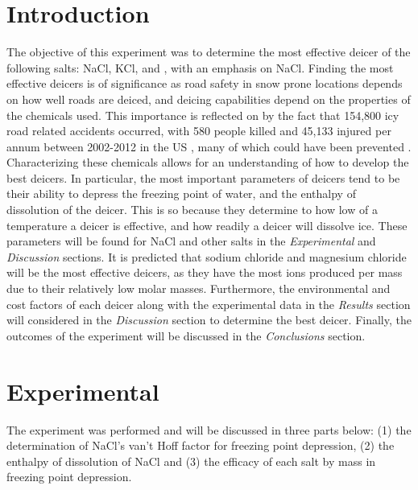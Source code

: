 \documentclass[12pt, letterpaper]{article}
\begin{document}
\section{Introduction}\doublespacing
The objective of this experiment was to determine the most effective deicer of the following salts:  NaCl, KCl,  and , with an emphasis on NaCl. Finding the most effective deicers is of significance as road safety in snow prone locations depends on how well roads are deiced, and deicing capabilities depend on the properties of the chemicals used. This importance is reflected on by the fact that 154,800 icy road related accidents occurred, with 580 people killed and 45,133 injured per annum between 2002-2012 in the US \cite{icy}, many of which could have been prevented . Characterizing these chemicals allows for an understanding of how to develop the best deicers. In particular, the most important parameters of deicers tend to be their ability to depress the freezing point of water, and the enthalpy of dissolution of the deicer. This is so because they determine to how low of a temperature a deicer is effective, and how readily a deicer will dissolve ice. These parameters will be found for NaCl and other salts in the \textit{Experimental} and \textit{Discussion} sections. It is predicted that sodium chloride and magnesium chloride will be the most effective deicers, as they have the most ions produced per mass due to their relatively low molar masses. Furthermore, the environmental and cost factors of each deicer along with the experimental data in the \textit{Results} section will considered in the \textit{Discussion} section to determine the best deicer. Finally, the outcomes of the experiment will be discussed in the \textit{Conclusions} section.
\section{Experimental}
The experiment was performed and will be discussed in three parts below: (1) the determination of NaCl's van't Hoff factor for freezing point depression, (2) the enthalpy of dissolution of NaCl and (3) the efficacy of each salt by mass in freezing point depression.
\end{document}
